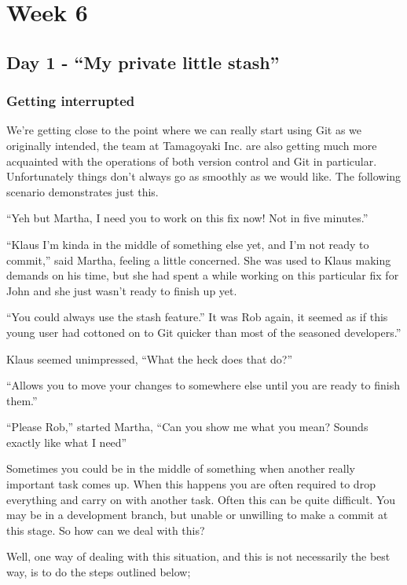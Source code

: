\cleardoublepage
\chapter{Week 6}
\section{Day 1 - ``My private little stash''}
\subsection{Getting interrupted}

We're getting close to the point where we can really start using Git as we originally intended, the team at Tamagoyaki Inc.
are also getting much more acquainted with the operations of both version control and Git in particular.
Unfortunately things don't always go as smoothly as we would like.
The following scenario demonstrates just this.

\begin{trenches}
``Yeh but Martha, I need you to work on this fix now! Not in five minutes.''

``Klaus I'm kinda in the middle of something else yet, and I'm not ready to commit,'' said Martha, feeling a little concerned.
She was used to Klaus making demands on his time, but she had spent a while working on this particular fix for John and she just wasn't ready to finish up yet.

``You could always use the stash feature.''
It was Rob again, it seemed as if this young user had cottoned on to Git quicker than most of the seasoned developers.''

Klaus seemed unimpressed, ``What the heck does that do?''

``Allows you to move your changes to somewhere else until you are ready to finish them.''

``Please Rob,'' started Martha,
``Can you show me what you mean? Sounds exactly like what I need''
\end{trenches}

Sometimes you could be in the middle of something when another really important task comes up.
When this happens you are often required to drop everything and carry on with another task.
Often this can be quite difficult.
You may be in a development branch, but unable or unwilling to make a commit at this stage.
So how can we deal with this?

Well, one way of dealing with this situation, and this is not necessarily the best way, is to do the steps outlined below;

